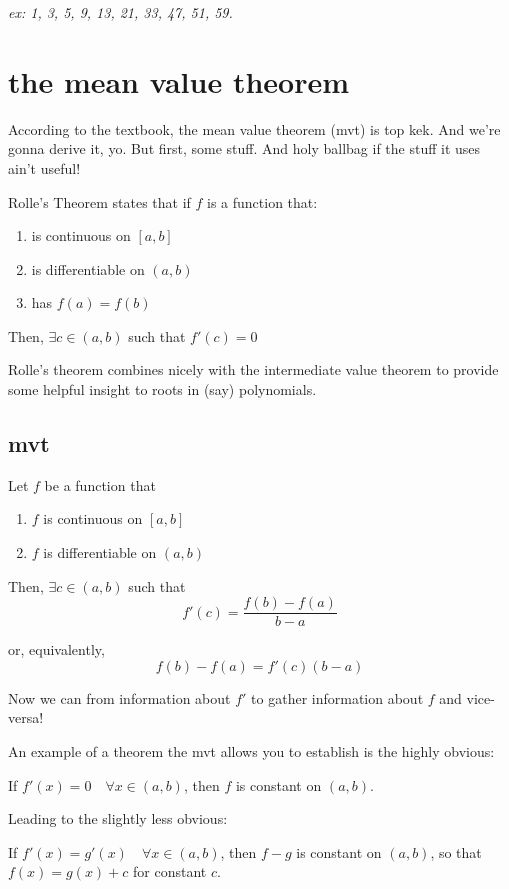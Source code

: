 \documentclass[10pt,a4paper]{report}
\begin{document}
\emph{ex: 1, 3, 5, 9, 13, 21, 33, 47, 51, 59.}

\section{the mean value theorem}

According to the textbook, the mean value theorem (mvt) is top kek. And we're gonna derive it, yo. But first, some stuff. And holy ballbag if the stuff it uses ain't useful!

Rolle's Theorem states that if $f$ is a function that:
\begin{enumerate}
	\item is continuous on $[a, b]$
	\item is differentiable on $(a, b)$
	\item has $f(a) = f(b)$
\end{enumerate}
Then, $\exists c \in (a, b)$ such that $f'(c) = 0$

Rolle's theorem combines nicely with the intermediate value theorem to provide some helpful insight to roots in (say) polynomials.

\subsection{mvt}

Let $f$ be a function that

\begin{enumerate}
	\item $f$ is continuous on $[a, b]$
	\item $f$ is differentiable on $(a, b)$
\end{enumerate}

Then, $\exists c \in (a, b)$ such that
$$
	f'(c) = \frac{f(b) - f(a)}{b - a}
$$

or, equivalently,
$$
	f(b) - f(a) = f'(c)(b - a)
$$

Now we can from information about $f'$ to gather information about $f$ and vice-versa! 

An example of a theorem the mvt allows you to establish is the highly obvious:

If $f'(x) = 0 \quad \forall x \in (a, b)$, then $f$ is constant on $(a, b)$.

Leading to the slightly less obvious:

If $f'(x) = g'(x) \quad \forall x \in (a, b)$, then $f - g$ is constant on $(a, b)$, so that $f(x) = g(x) + c$ for constant $c$.
\end{document}
